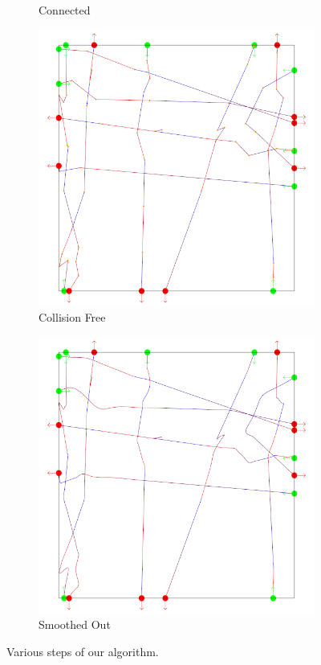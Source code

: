 \begin{figure}[t]
\begin{subfigure}[b]{0.24\linewidth}
 	\caption{Connected}
 \end{subfigure}
 \begin{subfigure}[b]{0.24\linewidth}
 	\includegraphics[width=\linewidth]{images/steps-collisionFree.png}
 	\caption{Collision Free}
 \end{subfigure}
 \begin{subfigure}[b]{0.24\linewidth}
 	\includegraphics[width=\linewidth]{images/steps-smoothed.png}
 	\caption{Smoothed Out}
 \end{subfigure}
 \caption{Various steps of our algorithm.}
 \label{fig:res:steps}
\end{figure}


